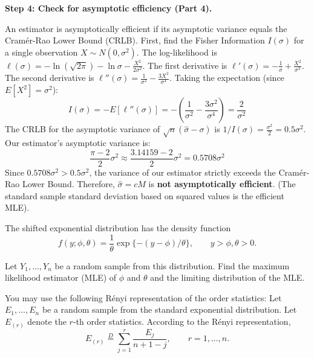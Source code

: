 \begin{solution}
\textbf{Step 4: Check for asymptotic efficiency (Part 4).}

An estimator is asymptotically efficient if its asymptotic variance equals the Cramér-Rao Lower Bound (CRLB).
First, find the Fisher Information $I(\sigma)$ for a single observation $X \sim N(0, \sigma^2)$.
The log-likelihood is $\ell(\sigma) = -\ln(\sqrt{2\pi}) - \ln\sigma - \frac{X^2}{2\sigma^2}$.
The first derivative is $\ell'(\sigma) = -\frac{1}{\sigma} + \frac{X^2}{\sigma^3}$.
The second derivative is $\ell''(\sigma) = \frac{1}{\sigma^2} - \frac{3X^2}{\sigma^4}$.
Taking the expectation (since $E[X^2] = \sigma^2$):
\[ I(\sigma) = -E[\ell''(\sigma)] = -\left( \frac{1}{\sigma^2} - \frac{3\sigma^2}{\sigma^4} \right) = \frac{2}{\sigma^2} \]
The CRLB for the asymptotic variance of $\sqrt{n}(\hat{\sigma} - \sigma)$ is $1/I(\sigma) = \frac{\sigma^2}{2} = 0.5 \sigma^2$.
Our estimator's asymptotic variance is:
\[ \frac{\pi - 2}{2} \sigma^2 \approx \frac{3.14159 - 2}{2} \sigma^2 = 0.5708 \sigma^2 \]
Since $0.5708 \sigma^2 > 0.5 \sigma^2$, the variance of our estimator strictly exceeds the Cramér-Rao Lower Bound.
Therefore, $\hat{\sigma} = cM$ is \textbf{not asymptotically efficient}. (The standard sample standard deviation based on squared values is the efficient MLE).
\end{solution}

\begin{exercise}\label{probability:2014:10}
The shifted exponential distribution has the density function
\[
f(y; \phi, \theta) = \frac{1}{\theta}\exp\{-(y-\phi)/\theta\}, \qquad y > \phi, \theta > 0.
\]

Let $Y_1, \dots, Y_n$ be a random sample from this distribution. Find the maximum likelihood estimator (MLE) of $\phi$ and $\theta$ and the limiting distribution of the MLE.

You may use the following R\'enyi representation of the order statistics: Let $E_1, \ldots, E_n$ be a random sample from the standard exponential distribution. Let $E_{(r)}$ denote the $r$-th order statistics. According to the R\'enyi representation,
\[
E_{(r)} \stackrel{D}{=} \sum_{j=1}^r \frac{E_j}{n+1-j}, \qquad r = 1, \ldots, n.
\]
\end{exercise}

